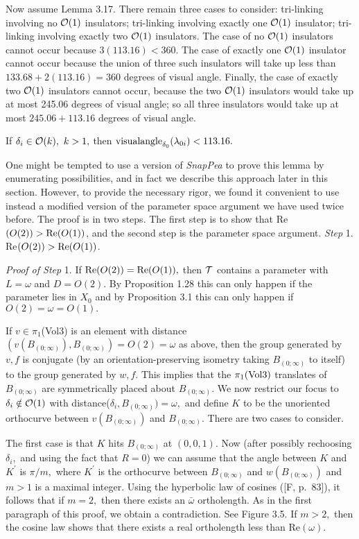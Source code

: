 Now assume Lemma 3.17.  There remain
three cases to consider: tri-linking involving no ${\cal O}(1)$ insulators; tri-linking involving exactly one ${\cal O} (1)$ insulator; 
tri-linking involving exactly two ${\cal O} (1)$ insulators.  The case of no ${\cal O} (1)$ insulators cannot occur because  $3(113.16) < 360$.  The case of exactly one ${\cal O} (1)$ insulator cannot occur because
the union of
three such insulators will take up less than $133.68 + 2(113.16)=360$
degrees of visual angle. 
Finally, the case of exactly two ${\cal O} (1)$ insulators cannot occur, because the two ${\cal O} (1)$ insulators would take up at most 245.06 degrees of visual
angle;
 so all three insulators would take up at most 
$245.06 + 113.16$ degrees of visual angle.
\enddemo

 If $\delta_i \in {\cal O}(k),\ k>1,$ then ${\rm
visualangle}_{\delta_0}(\lambda_{0i}) < 113.16.$
\endproclaim

One might be tempted
to use a version of {\it SnapPea} to prove
this lemma by enumerating possibilities, and in fact we 
describe this approach later in this section.
However, to provide the necessary rigor, we found it 
convenient to use instead a modified version of the parameter space 
argument we have used twice before. 
The proof is in two steps.  The first step is to show that
Re$(O(2))>{\rm Re}(O(1))$, and the second step is
the parameter space argument.
{\it Step} 1.  Re$(O(2))>{\rm Re}(O(1))$.

{\it Proof of Step} 1.  
If ${\rm Re}(O(2)) = {\rm Re}(O(1)),$ then 
${\cal T}$ contains a parameter with $L = \omega$
and $D = O(2).$  By Proposition 1.28 this can only happen if the parameter
lies in $X_0$ and by Proposition 3.1 this can only happen if 
$O(2) = \omega = O(1).$

If $v\in
\pi_1$({\rm Vol3}) is an element with distance$(v(B_{(0;\infty)}), B_{(0;\infty)})=O(2) = \omega$ as above, then the group
generated by $v,f$ is conjugate (by an orientation-preserving isometry taking $ B_{(0;\infty)}$ to itself) to the group generated by $w,f.$
This implies that the $\pi_1({\rm Vol3})$ translates of $B_{(0;\infty)}$ are symmetrically placed about $B_{(0;\infty)}$.  
We now restrict our focus to 
$\delta_i\notin {\cal O}(1)$  with distance($\delta_i, B_{(0;\infty)})=\omega,$ and define $K$ to be the 
unoriented orthocurve between $v(B_{(0;\infty)})$ and $B_{(0;\infty)}.$ 
There are two cases to consider.

The first case is that $K$ hits $B_{(0;\infty)}$ at $(0,0,1).$ 
Now (after possibly rechoosing $\delta_i,$
and using the fact
that $R = 0$) we can assume that the angle between $K$ and
$K^\prime$ is $\pi/m,$ where $K^\prime$ is the orthocurve between $B_{(0;\infty)}$ and $w(B_{(0;\infty)})$ and
$m>1$ is a maximal integer.  
Using the hyperbolic law of cosines ([F, p.~83]), 
it follows that if $m=2,$ then there exists an $\bar \omega$
ortholength.  As in the first paragraph of this proof, we obtain a contradiction. See
Figure 3.5. If $m>2,$ then the cosine law shows
that there exists a real ortholength less than Re$(\omega).$


